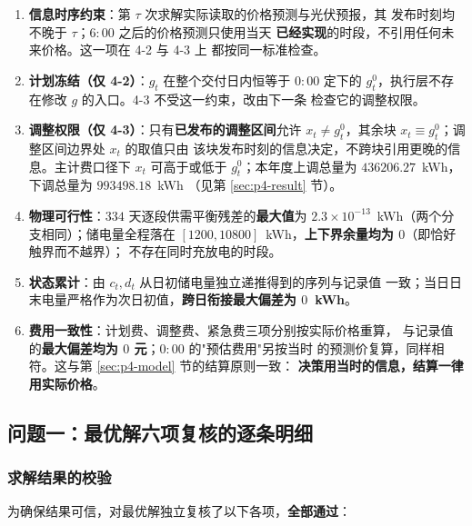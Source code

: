 \begin{enumerate}
  \item \textbf{信息时序约束}：第 $\tau$ 次求解实际读取的价格预测与光伏预报，其
        发布时刻均不晚于 $\tau$；$6{:}00$ 之后的价格预测只使用当天
        \textbf{已经实现}的时段，不引用任何未来价格。这一项在 4-2 与 4-3 上
        都按同一标准检查。
  \item \textbf{计划冻结（仅 4-2）}：$g_t$ 在整个交付日内恒等于 $0{:}00$ 定下的
        $g_t^0$，执行层不存在修改 $g$ 的入口。4-3 不受这一约束，改由下一条
        检查它的调整权限。
  \item \textbf{调整权限（仅 4-3）}：只有\textbf{已发布的调整区间}允许
        $x_t\neq g_t^0$，其余块 $x_t\equiv g_t^0$；调整区间边界处 $x_t$ 的取值只由
        该块发布时刻的信息决定，不跨块引用更晚的信息。主计费口径下
        $x_t$ 可高于或低于 $g_t^0$；本年度上调总量为
        $436206.27$~kWh，下调总量为 $993498.18$~kWh
        （见第 \ref{sec:p4-result} 节）。
  \item \textbf{物理可行性}：$334$ 天逐段供需平衡残差的\textbf{最大值}为
        $2.3\times10^{-13}$~kWh（两个分支相同）；储电量全程落在
        $[1200,10800]$~kWh，\textbf{上下界余量均为 $0$}（即恰好触界而不越界）；
        不存在同时充放电的时段。
  \item \textbf{状态累计}：由 $c_t,d_t$ 从日初储电量独立递推得到的序列与记录值
        一致；当日日末电量严格作为次日初值，\textbf{跨日衔接最大偏差为
        $0$~kWh}。
  \item \textbf{费用一致性}：计划费、调整费、紧急费三项分别按实际价格重算，
        与记录值的\textbf{最大偏差均为 $0$ 元}；$0{:}00$ 的"预估费用"另按当时
        的预测价复算，同样相符。这与第 \ref{sec:p4-model} 节的结算原则一致：
        \textbf{决策用当时的信息，结算一律用实际价格}。
\end{enumerate}


\subsection{问题一：最优解六项复核的逐条明细}
\label{app:p1-checks}

\subsubsection{求解结果的校验}

为确保结果可信，对最优解独立复核了以下各项，\textbf{全部通过}：

